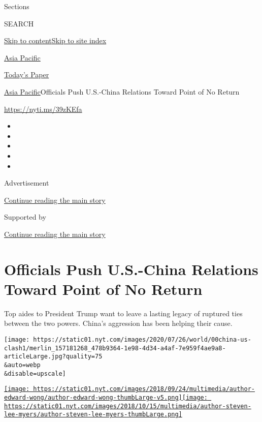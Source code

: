 Sections

SEARCH

\protect\hyperlink{site-content}{Skip to
content}\protect\hyperlink{site-index}{Skip to site index}

\href{https://www.nytimes.com/section/world/asia}{Asia Pacific}

\href{https://myaccount.nytimes.com/auth/login?response_type=cookie\&client_id=vi}{}

\href{https://www.nytimes.com/section/todayspaper}{Today's Paper}

\href{/section/world/asia}{Asia Pacific}\textbar{}Officials Push
U.S.-China Relations Toward Point of No Return

\url{https://nyti.ms/39zKEfa}

\begin{itemize}
\item
\item
\item
\item
\item
\end{itemize}

Advertisement

\protect\hyperlink{after-top}{Continue reading the main story}

Supported by

\protect\hyperlink{after-sponsor}{Continue reading the main story}

\hypertarget{officials-push-us-china-relations-toward-point-of-no-return}{%
\section{Officials Push U.S.-China Relations Toward Point of No
Return}\label{officials-push-us-china-relations-toward-point-of-no-return}}

Top aides to President Trump want to leave a lasting legacy of ruptured
ties between the two powers. China's aggression has been helping their
cause.

\texttt{[image: https://static01.nyt.com/images/2020/07/26/world/00china-us-clash1/merlin\_157181268\_478b9364-1e98-4d34-a4af-7e959f4ae9a8-articleLarge.jpg?quality=75\\\&auto=webp\\\&disable=upscale]}

\href{https://www.nytimes.com/by/edward-wong}{\texttt{[image: https://static01.nyt.com/images/2018/09/24/multimedia/author-edward-wong/author-edward-wong-thumbLarge-v5.png]}}\href{https://www.nytimes.com/by/steven-lee-myers}{\texttt{[image: https://static01.nyt.com/images/2018/10/15/multimedia/author-steven-lee-myers/author-steven-lee-myers-thumbLarge.png]}}

